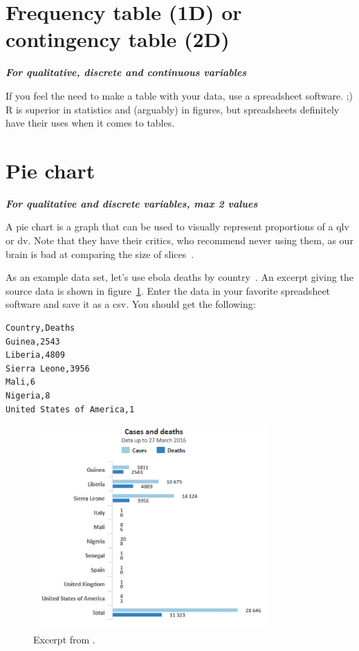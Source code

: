 \documentclass{report}
\newcommand{\notefor}[1]{\hfill\textbf{\textit{#1}}}
\begin{document}
	\section{Frequency table (1D) or contingency table (2D)}
	\notefor{For qualitative, discrete and continuous variables}
		
	If you feel the need to make a table with your data, use a spreadsheet software. ;) R is superior in statistics and (arguably) in figures, but spreadsheets definitely have their uses when it comes to tables.
	
	\section{Pie chart}
	\notefor{For qualitative and discrete variables, max 2 values}
		
	A pie chart is a graph that can be used to visually represent proportions of a \gls{qlv} or \gls{dv}. Note that they have their critics, who recommend never using them, as our brain is bad at comparing the size of slices~\cite{wiki_pie}.
	
	As an example data set, let's use ebola deaths by country~\cite{who}. An excerpt giving the source data is shown in figure~\ref{fig:ebola}. Enter the data in your favorite spreadsheet software and save it as a csv. You should get the following:
	\begin{verbatim}
Country,Deaths
Guinea,2543
Liberia,4809
Sierra Leone,3956
Mali,6
Nigeria,8
United States of America,1
	\end{verbatim}
	\begin{figure}[h]
		\centering
		\includegraphics[width=0.8\textwidth]{ebola.png}
		\caption{Excerpt from \cite{who}.}
		\label{fig:ebola}
	\end{figure}
\end{document}
